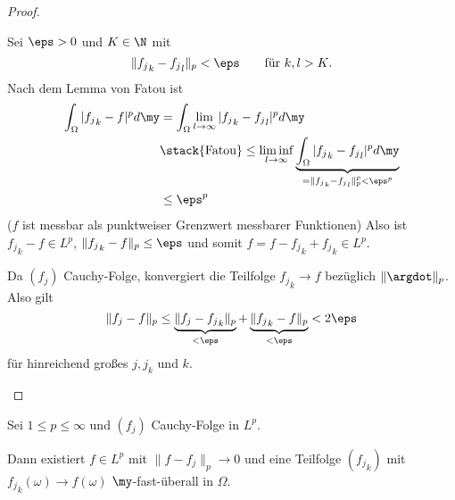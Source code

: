 \begin{st}
\begin{proof}
\begin{seg}[$1 \le p < \infty$]
\begin{enumerate}[a)]
					Sei $\eps > 0$ und $K \in \N$ mit
					\[
						\|{f_j}_k - {f_j}_l \|_p < \eps  \qquad \text{für $k,l > K$.}
					\]
					Nach dem Lemma von Fatou ist
					\begin{align*}
						\int_{\Omega} |{f_j}_k - f|^p d\my
						&= \int_{\Omega} \lim_{l\to \infty} |{f_j}_k - {f_j}_l |^p d\my \\
						&\stack{\text{Fatou}}\le \liminf_{l\to \infty} \underbrace{\int_{\Omega} |{f_j}_k - {f_j}_l |^p d\my}_{= \|{f_j}_k - {f_j}_l\|_p^p < \eps^p} \\
						&\le \eps^p
					\end{align*}
					($f$ ist messbar als punktweiser Grenzwert messbarer Funktionen)
					Also ist ${f_j}_k - f \in L^p$, $\|{f_j}_k - f\|_p \le \eps$ und somit $f = f - {f_j}_k + {f_j}_k \in L^p$.

					Da $(f_j)$ Cauchy-Folge, konvergiert die Teilfolge ${f_j}_k \to f$ bezüglich $\|\argdot\|_p$.
					Also gilt
					\[
						\|f_j - f\|_p 
						\le \underbrace{\|f_j - {f_j}_k \|_p}_{< \eps} + \underbrace{\|{f_j}_k - f\|_p}_{< \eps}
						< 2 \eps
					\]
					für hinreichend großes $j, j_k$ und $k$.
			\end{enumerate}
		\end{seg}
	\end{proof}
\end{st}
\setcounter{thm}{13}
\begin{kor}[Weyl] \label{2.14}
	Sei $1 \le p \le \infty$ und $(f_j)$ Cauchy-Folge in $L^p$.
	
	Dann existiert $f \in L^p$ mit $\|f - f_j\|_p \to 0$ und eine Teilfolge $({f_j}_k)$ mit ${f_j}_k(\omega) \to f(\omega)$ $\my$-fast-überall in $\Omega$.
\end{kor}

